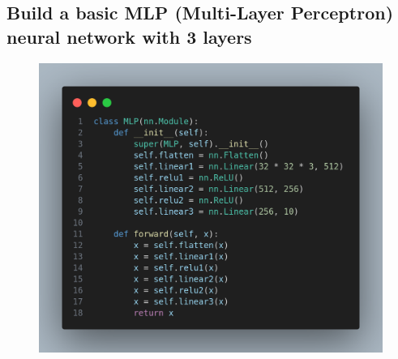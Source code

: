 \documentclass[a4paper,12pt]{article}
\begin{document}
\subsection{Build a basic MLP (Multi-Layer Perceptron) neural network with 3 layers}

\begin{figure}[h]
    \centering
    \includegraphics[width=0.7\linewidth]{images/MLP_model.png}
    \label{fig:enter-label}
\end{figure}
\end{document}
